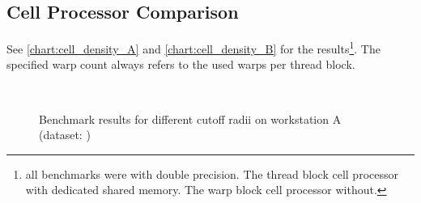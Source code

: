 \subsection{Cell Processor Comparison}
\label{subsec:dataset_info}
See \autoref{chart:cell_density_A} and \autoref{chart:cell_density_B} for the results\footnote{all benchmarks were with double precision. The thread block cell processor with dedicated shared memory. The warp block cell processor without.}. The specified warp count always refers to the used warps per thread block.

\begin{figure}
\centering
{}
\\
\caption{Benchmark results for different cutoff radii on workstation A (dataset: )}
\label{chart:cell_density_A}
\end{figure}

